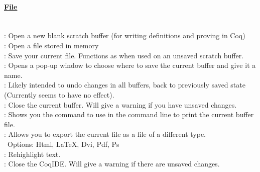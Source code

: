 
\paragraph{\underline{File}}
~\\
 : Open a new blank scratch buffer (for writing definitions and proving in Coq)
\\
 : Open a file stored in memory
\\
 : Save your current file. Functions as  when used on an unsaved scratch buffer. 
\\ 
 : Opens a pop-up window to choose where to save the current buffer and give it a name. 
\\
 : Likely intended to undo changes in all buffers, back to previously saved state 
	(Currently seems to have no effect).  %
\\
 : Close the current buffer. Will give a warning if you have unsaved changes. 
\\
 : Shows you the command to use in the command line to print the current buffer file. 
\\
 : Allows you to export the current file as a file of a different type. 
	\\ \-\ \qquad Options: Html, LaTeX, Dvi, Pdf, Ps
\\
 : Rehighlight text. %
\\
 : Close the CoqIDE. Will give a warning if there are unsaved changes. 





~\\
